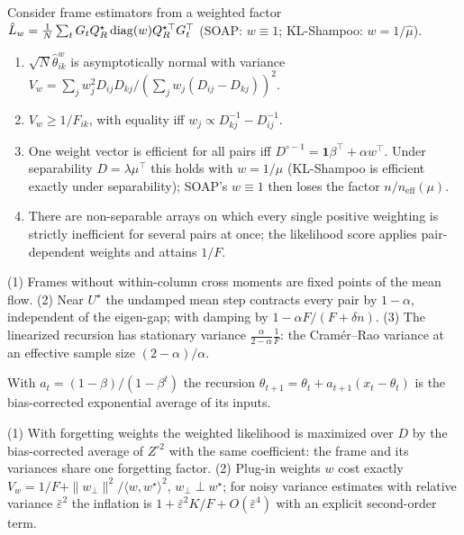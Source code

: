 \begin{theorem}\label{thm:efficiency}
Consider frame estimators from a weighted factor $\hat L_w=\frac1N\sum_tG_tQ_R^\star\operatorname{diag}(w)
Q_R^{\star\top}G_t^\top$ (SOAP: $w\equiv1$; KL-Shampoo: $w=1/\hat\mu$).
\begin{enumerate}[nosep]
\item $\sqrt N\hat\theta^w_{ik}$ is asymptotically normal with variance
  $V_w=\sum_jw_j^2D_{ij}D_{kj}/(\sum_jw_j(D_{ij}-D_{kj}))^2$.
\item $V_w\ge1/F_{ik}$, with equality iff $w_j\propto D_{kj}^{-1}-D_{ij}^{-1}$.
\item One weight vector is efficient for all pairs iff $D^{\circ-1}=\mathbf1\beta^\top+\alpha w^\top$.
  Under separability $D=\lambda\mu^\top$ this holds with $w=1/\mu$ (KL-Shampoo is efficient
  exactly under separability); SOAP's $w\equiv1$ then loses the factor $n/n_{\mathrm{eff}}(\mu)$.
\item There are non-separable arrays on which every single positive weighting is strictly
  inefficient for several pairs at once; the likelihood score applies pair-dependent weights and
  attains $1/F$.
\end{enumerate}
\end{theorem}

\begin{theorem}
\label{thm:flow}
(1) Frames without within-column cross moments are fixed points of the mean flow. (2) Near
$U^\star$ the undamped mean step contracts every pair by $1-\alpha$, independent of the eigen-gap;
with damping by $1-\alpha F/(F+\delta n)$. (3) The linearized recursion has stationary variance
$\frac{\alpha}{2-\alpha}\frac1F$: the Cram\'er--Rao variance at an effective sample size
$(2-\alpha)/\alpha$.
\end{theorem}

\begin{theorem}\label{thm:schedule}
With $a_t=(1-\beta)/(1-\beta^t)$ the recursion $\theta_{t+1}=\theta_t+a_{t+1}(x_t-\theta_t)$ is the
bias-corrected exponential average of its inputs.
\end{theorem}

\begin{lemma}
\label{lem:profile}
(1) With forgetting weights the weighted likelihood is maximized over $D$ by the bias-corrected
average of $Z^{\circ2}$ with the same coefficient: the frame and its variances share one forgetting
factor. (2) Plug-in weights $w$ cost exactly
$V_w=1/F+\|w_\perp\|^2/\langle w,w^\star\rangle^2$, $w_\perp\perp w^\star$; for noisy variance
estimates with relative variance $\bar\varepsilon^2$ the inflation is
$1+\bar\varepsilon^2K/F+O(\bar\varepsilon^4)$ with an explicit second-order term.
\end{lemma}

